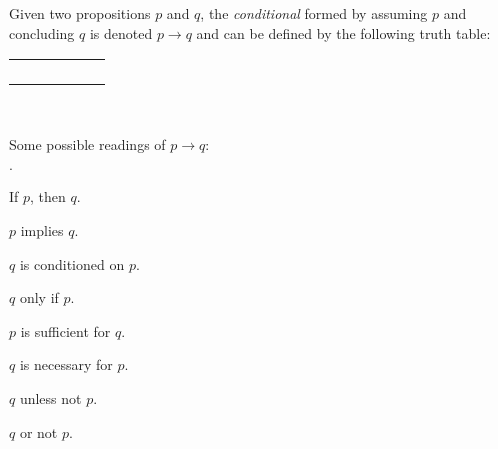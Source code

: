 \begin{definition}
    \begin{center}
        \begin{minipage}[t]{.55\linewidth}
            Given two propositions \(p\) and \(q\),
            the \emph{conditional} formed by assuming \(p\) and concluding \(q\)
            is denoted \(p \rightarrow q\) and can be defined by the following truth table:
            \begin{table}[H]
                \centering
                \label{tab:implies}
                \begin{tabular}{|CcCc||Cc|} \hline
                     &  &  \\ \hline
                    \thead{\(\top\)} & \thead{\(\top\)} &  \\
                    \thead{\(\top\)} & \thead{\(\bot\)} &  \\
                    \thead{\(\bot\)} & \thead{\(\top\)} &  \\
                    \thead{\(\bot\)} & \thead{\(\bot\)} &  \\ \hline
                \end{tabular}
            \end{table}
        \end{minipage}%
        \begin{minipage}[t]{.05\linewidth}
            ~
        \end{minipage}%
        \begin{minipage}[t]{.4\linewidth}
            Some possible readings of \(p \rightarrow q\):\\
            \begin{list}{\(\cdot\)}{}
                \item
                    If \(p\), then \(q\).
                \item
                    \(p\) implies \(q\).
                \item
                    \(q\) is conditioned on \(p\).
                \item
                    \(q\) only if \(p\).
                \item
                    \(p\) is sufficient for \(q\).
                \item
                    \(q\) is necessary for \(p\).
                \item
                    \(q\) unless not \(p\).
                \item
                    \(q\) or not \(p\).
            \end{list}
        \end{minipage}
    \end{center}
\end{definition}

